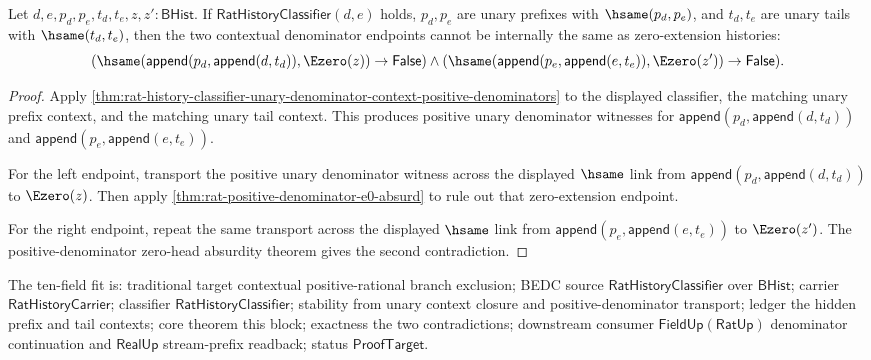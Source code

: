 \begin{theorem}
\label{thm:rat-history-classifier-unary-context-zero-extension-endpoint-exclusion}
Let $d,e,p_d,p_e,t_d,t_e,z,z':\mathsf{BHist}$. If
$\mathsf{RatHistoryClassifier}(d,e)$ holds, $p_d,p_e$ are unary prefixes with
$\hsame(p_d,p_e)$, and $t_d,t_e$ are unary tails with $\hsame(t_d,t_e)$, then
the two contextual denominator endpoints cannot be internally the same as
zero-extension histories:
$$
(\hsame(\mathsf{append}(p_d,\mathsf{append}(d,t_d)),\Ezero(z))\to
\mathsf{False})\land
(\hsame(\mathsf{append}(p_e,\mathsf{append}(e,t_e)),\Ezero(z'))\to
\mathsf{False}).
$$
\end{theorem}
\begin{proof}
Apply
\autoref{thm:rat-history-classifier-unary-denominator-context-positive-denominators}
to the displayed classifier, the matching unary prefix context, and the
matching unary tail context. This produces positive unary denominator witnesses
for $\mathsf{append}(p_d,\mathsf{append}(d,t_d))$ and
$\mathsf{append}(p_e,\mathsf{append}(e,t_e))$.

For the left endpoint, transport the positive unary denominator witness across
the displayed $\hsame$ link from
$\mathsf{append}(p_d,\mathsf{append}(d,t_d))$ to $\Ezero(z)$. Then apply
\autoref{thm:rat-positive-denominator-e0-absurd} to rule out that
zero-extension endpoint.

For the right endpoint, repeat the same transport across the displayed
$\hsame$ link from $\mathsf{append}(p_e,\mathsf{append}(e,t_e))$ to
$\Ezero(z')$. The positive-denominator zero-head absurdity theorem gives the
second contradiction.
\end{proof}

The ten-field fit is: traditional target contextual positive-rational branch
exclusion; BEDC source $\mathsf{RatHistoryClassifier}$ over $\mathsf{BHist}$;
carrier $\mathsf{RatHistoryCarrier}$; classifier
$\mathsf{RatHistoryClassifier}$; stability from unary context closure and
positive-denominator transport; ledger the hidden prefix and tail contexts;
core theorem this block; exactness the two contradictions; downstream consumer
$\mathsf{FieldUp}(\mathsf{RatUp})$ denominator continuation and
$\mathsf{RealUp}$ stream-prefix readback; status $\mathsf{ProofTarget}$.

